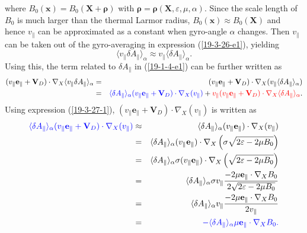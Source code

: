 \documentclass{article}
\newcommand{\tmcolor}[2]{{\color{#1}{#2}}}
\newcommand{\tmmathbf}[1]{\ensuremath{\boldsymbol{#1}}}
\begin{document}
where $B_0 (\mathbf{x}) = B_0 (\mathbf{X}+\tmmathbf{\rho})$ with
$\tmmathbf{\rho}=\tmmathbf{\rho} (\mathbf{X}, \varepsilon, \mu, \alpha)$.
Since the scale length of $B_0$ is much larger than the thermal Larmor radius,
$B_0 (\mathbf{x}) \approx B_0 (\mathbf{X})$ and hence $v_{\parallel}$ can be
approximated as a constant when gyro-angle $\alpha$ changes. Then
$v_{\parallel}$ can be taken out of the gyro-averaging in expression
(\ref{19-3-26-e1}), yielding
\begin{equation}
  \langle v_{\parallel} \delta A_{\parallel} \rangle_{\alpha} \approx
  v_{\parallel} \langle \delta A_{\parallel} \rangle_{\alpha} .
\end{equation}
Using this, the term related to $\delta A_{\parallel}$ in (\ref{19-1-4-e1})
can be further written as
\begin{eqnarray}
  (v_{\parallel} \mathbf{e}_{\parallel} +\mathbf{V}_D) \cdot \nabla_X \langle
  v_{\parallel} \delta A_{\parallel} \rangle_{\alpha} & = & (v_{\parallel}
  \mathbf{e}_{\parallel} +\mathbf{V}_D) \cdot \nabla_X (v_{\parallel} \langle
  \delta A_{\parallel} \rangle_{\alpha}) \nonumber\\
  & = & \tmcolor{blue}{\langle \delta A_{\parallel} \rangle_{\alpha}
  (v_{\parallel} \mathbf{e}_{\parallel} +\mathbf{V}_D) \cdot \nabla_X
  (v_{\parallel})} + \tmcolor{red}{v_{\parallel} (v_{\parallel}
  \mathbf{e}_{\parallel} +\mathbf{V}_D) \cdot \nabla_X \langle \delta
  A_{\parallel} \rangle_{\alpha}} . 
\end{eqnarray}
Using expression (\ref{19-3-27-1}), $(v_{\parallel} \mathbf{e}_{\parallel}
+\mathbf{V}_D) \cdot \nabla_X (v_{\parallel})$ is written as
\begin{eqnarray}
  \tmcolor{blue}{\langle \delta A_{\parallel} \rangle_{\alpha} (v_{\parallel}
  \mathbf{e}_{\parallel} +\mathbf{V}_D) \cdot \nabla_X (v_{\parallel})} &
  \approx & \langle \delta A_{\parallel} \rangle_{\alpha} (v_{\parallel}
  \mathbf{e}_{\parallel}) \cdot \nabla_X (v_{\parallel}) \nonumber\\
  & = & \langle \delta A_{\parallel} \rangle_{\alpha} (v_{\parallel}
  \mathbf{e}_{\parallel}) \cdot \nabla_X \left( \sigma \sqrt{2 \varepsilon - 2
  \mu B_0} \right) \nonumber\\
  & = & \langle \delta A_{\parallel} \rangle_{\alpha} \sigma (v_{\parallel}
  \mathbf{e}_{\parallel}) \cdot \nabla_X \left( \sqrt{2 \varepsilon - 2 \mu
  B_0} \right) \nonumber\\
  & = & \langle \delta A_{\parallel} \rangle_{\alpha} \sigma v_{\parallel}
  \frac{- 2 \mu \mathbf{e}_{\parallel} \cdot \nabla_X B_0}{2 \sqrt{2
  \varepsilon - 2 \mu B_0}} \nonumber\\
  & = & \langle \delta A_{\parallel} \rangle_{\alpha} v_{\parallel} \frac{- 2
  \mu \mathbf{e}_{\parallel} \cdot \nabla_X B_0}{2 v_{\parallel}} \nonumber\\
  & = & \tmcolor{blue}{- \langle \delta A_{\parallel} \rangle_{\alpha} \mu
  \mathbf{e}_{\parallel} \cdot \nabla_X B_0 .} 
\end{eqnarray}
\end{document}
